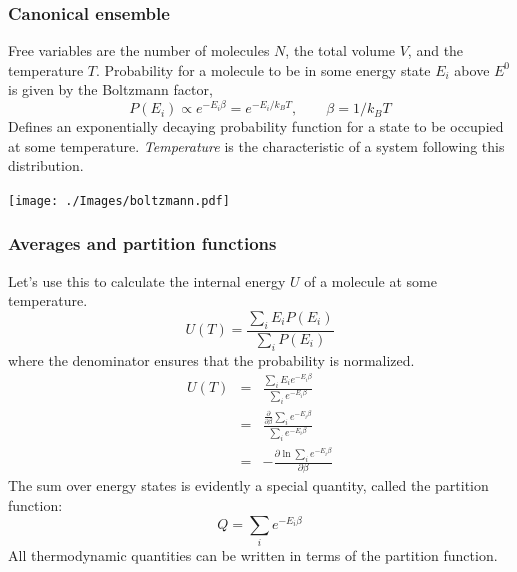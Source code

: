\documentclass[11pt]{article}
\begin{document}
\subsubsection{Canonical ensemble}
\label{sec:org7dd1e98}
Free variables are the number of molecules \(N\), the total volume \(V\),
and the temperature \(T\).  Probability for a molecule to be in some
energy state \(E_i\) above \(E^0\) is given by the Boltzmann factor,
\begin{equation}
  P(E_i) \propto e^{-E_i\beta}=e^{-E_i/k_BT},\qquad\beta=1/k_BT
\end{equation}
Defines an exponentially decaying probability function for a state to be
occupied at some temperature.  \emph{Temperature} is the characteristic of
a system following this distribution.

\begin{center}
\texttt{[image: ./Images/boltzmann.pdf]}
\end{center}

\subsubsection{Averages and partition functions}
\label{sec:orga73b686}
Let's use this to calculate the internal energy \(U\) of a molecule at some
temperature.
\begin{equation}
  U(T)=\frac{\sum_iE_iP(E_i)}{\sum_iP(E_i)}
\end{equation}
where the denominator ensures that the probability is normalized.
\begin{eqnarray}
  U(T) & =& \frac{\sum_iE_i e^{-E_i\beta}}{\sum_ie^{-E_i\beta}} \\
  & = & \frac{\frac{\partial}{\partial\beta}\sum_ie^{-E_i\beta}}{\sum_ie^{-E_i
      \beta}}\\
& = & -\frac{\partial \ln \sum_i e^{-E_i\beta}}{\partial \beta}
\end{eqnarray}
The sum over energy states is evidently a special quantity, called the
partition function:
\begin{equation}
  Q=\sum_ie^{-E_i\beta}
\end{equation}
All thermodynamic quantities can be written in terms of the partition function.
\end{document}

